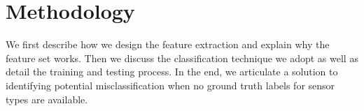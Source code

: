 
\section{Methodology}
We first describe how we design the feature extraction and explain why the feature set works. Then we discuss the classification technique we adopt as well as detail the training and testing process. In the end, we articulate a solution to identifying potential misclassification when no ground truth labels for sensor types are available.

